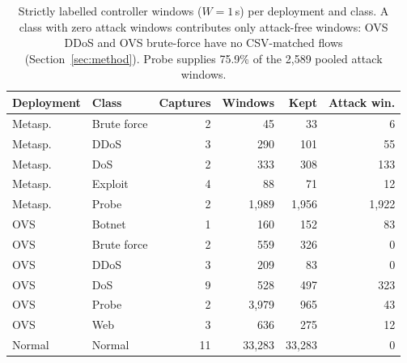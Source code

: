 \begin{table}[t]
\caption{Strictly labelled controller windows ($W{=}1$\,s) per deployment and class. A class with zero attack windows contributes only attack-free windows: OVS DDoS and OVS brute-force have no CSV-matched flows (Section~\ref{sec:method}). Probe supplies 75.9\% of the 2,589 pooled attack windows.}
\label{tab:deployment}
\centering\footnotesize\setlength{\tabcolsep}{3pt}
\begin{tabular}{llrrrr}
\toprule
Deployment & Class & Captures & Windows & Kept & Attack win. \\
\midrule
Metasp. & Brute force & 2 & 45 & 33 & 6 \\
Metasp. & DDoS & 3 & 290 & 101 & 55 \\
Metasp. & DoS & 2 & 333 & 308 & 133 \\
Metasp. & Exploit & 4 & 88 & 71 & 12 \\
Metasp. & Probe & 2 & 1,989 & 1,956 & 1,922 \\
OVS & Botnet & 1 & 160 & 152 & 83 \\
OVS & Brute force & 2 & 559 & 326 & 0 \\
OVS & DDoS & 3 & 209 & 83 & 0 \\
OVS & DoS & 9 & 528 & 497 & 323 \\
OVS & Probe & 2 & 3,979 & 965 & 43 \\
OVS & Web & 3 & 636 & 275 & 12 \\
Normal & Normal & 11 & 33,283 & 33,283 & 0 \\
\bottomrule
\end{tabular}
\end{table}
